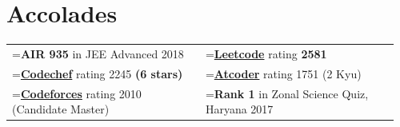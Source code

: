 \documentclass[]{plushcv}
\begin{document}
\begin{minipage}[t]{0.57\textwidth}

\section{Accolades}
{\setlength{\tabcolsep}{4pt}
\newlength{\accbull}\settowidth{\accbull}{\textbullet{}\hspace{5pt}}
\newcommand{\acc}[1]{\hangindent=\accbull\hangafter=1\textbullet{}\hspace{5pt}#1}
\begin{tabular}{@{}p{0.48\linewidth}p{0.48\linewidth}@{}}
\acc{\textbf{AIR 935} in JEE Advanced 2018} & \acc{\href{https://leetcode.com/anujdhillxn/}{\textbf{Leetcode}} rating \textbf{2581}}\\[1pt]
\acc{\href{https://www.codechef.com/users/anujdhillxn}{\textbf{Codechef}} rating 2245 \textbf{(6 stars)}} & \acc{\href{https://atcoder.jp/users/anujdhillon}{\textbf{Atcoder}} rating 1751 (2 Kyu)}\\[1pt]
\acc{\href{https://codeforces.com/profile/anujdhillxn}{\textbf{Codeforces}} rating 2010 (\mbox{Candidate} Master)} & \acc{\textbf{Rank 1} in Zonal Science Quiz, Haryana 2017}\\
\end{tabular}}
\sectionsep

%
%

\end{minipage} 
\hfill
\end{document}
